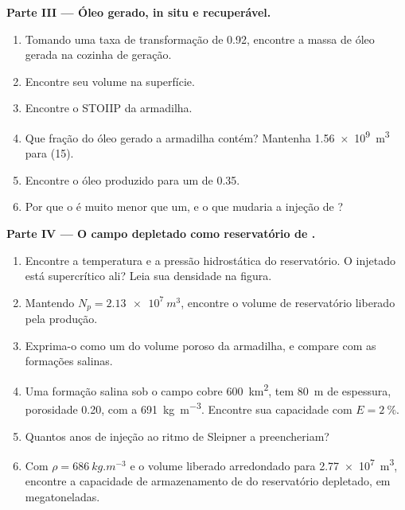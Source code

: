 \begin{problem}
\noindent\textbf{Parte III --- Óleo gerado, in situ e recuperável.}
\begin{enumerate}[resume]
  \item Tomando uma taxa de transformação de 0.92, encontre a massa de óleo gerada na cozinha de geração.
  \item Encontre seu volume na superfície.
  \item Encontre o STOIIP da armadilha.
  \item Que fração do óleo gerado a armadilha contém? Mantenha \qty{1.56e9}{m^3} para (15).
  \item Encontre o óleo produzido para um  de 0.35.
  \item Por que o  é muito menor que um, e o que mudaria a injeção de ?
\end{enumerate}

\noindent\textbf{Parte IV --- O campo depletado como reservatório de .}
\begin{enumerate}[resume]
  \item Encontre a temperatura e a pressão hidrostática do reservatório. O  injetado está
        supercrítico ali? Leia sua densidade na figura.
  \item Mantendo $N_p = \qty{2.13e7}{m^3}$, encontre o volume de reservatório liberado pela produção.
  \item Exprima-o como um  do volume poroso da armadilha, e compare com
        as formações salinas.
  \item Uma formação salina sob o campo cobre \qty{600}{km^2}, tem \qty{80}{m} de espessura,
        porosidade 0.20, com  a \qty{691}{kg.m^{-3}}. Encontre sua capacidade com $E =
        \qty{2}{\percent}$.
  \item Quantos anos de injeção ao ritmo de Sleipner a preencheriam?
  \item Com $\rho = \qty{686}{kg.m^{-3}}$ e o volume liberado arredondado para \qty{2.77e7}{m^3}, encontre
        a capacidade de armazenamento de  do reservatório depletado, em megatoneladas.
\end{enumerate}
\end{problem}
